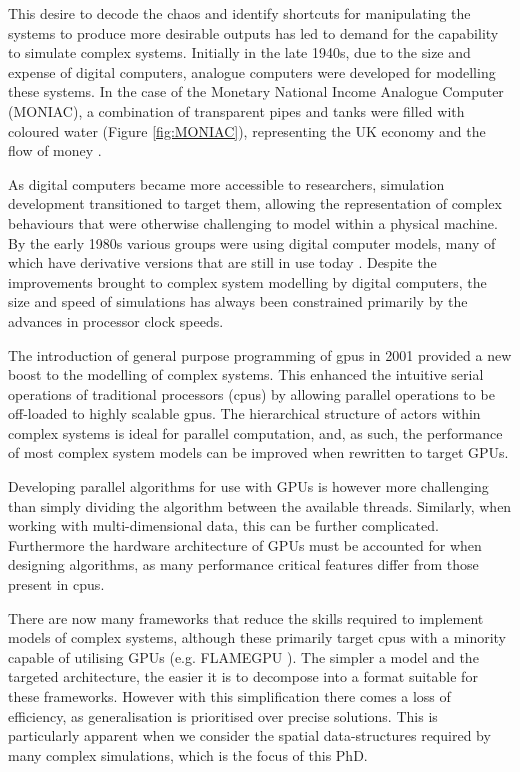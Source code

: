   This desire to decode the chaos and identify shortcuts for manipulating the systems to produce more desirable outputs has led to demand for the capability to simulate complex systems. Initially in the late 1940s, due to the size and expense of digital computers, analogue computers were developed for modelling these systems. In the case of the Monetary National Income Analogue Computer (MONIAC), a combination of transparent pipes and tanks were filled with coloured water (Figure \ref{fig:MONIAC}), representing the UK economy and the flow of money \cite{Pik54}.
  
  As digital computers became more accessible to researchers, simulation development transitioned to target them, allowing the representation of complex behaviours that were otherwise challenging to model within a physical machine. By the early 1980s various groups were using digital computer models, many of which have derivative versions that are still in use today \cite{Van82,GM85}. Despite the improvements brought to complex system modelling by digital computers, the size and speed of simulations has always been constrained primarily by the advances in processor clock speeds.
  
  The introduction of general purpose programming of \glspl{gpu} in 2001 provided a new boost to the modelling of complex systems. This enhanced the intuitive serial operations of traditional processors (\glspl{cpu}) by allowing parallel operations to be off-loaded to highly scalable \glspl{gpu}. The hierarchical structure of actors within complex systems is ideal for parallel computation, and, as such, the performance of most complex system models can be improved when rewritten to target GPUs.
  
  Developing parallel algorithms for use with GPUs is however more challenging than simply dividing the algorithm between the available threads. Similarly, when working with multi-dimensional data, this can be further complicated. Furthermore the hardware architecture of GPUs must be accounted for when designing algorithms, as many performance critical features differ from those present in \glspl{cpu}.
  
  There are now many frameworks that reduce the skills required to implement models of complex systems, although these primarily target \glspl{cpu} with a minority capable of utilising GPUs (e.g. FLAMEGPU \cite{RR11}). The simpler a model and the targeted architecture, the easier it is to decompose into a format suitable for these frameworks. However with this simplification there comes a loss of efficiency, as generalisation is prioritised over precise solutions. This is particularly apparent when we consider the spatial data-structures required by many complex simulations, which is the focus of this PhD.
  
